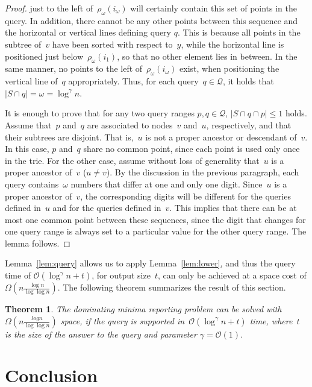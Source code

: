 \documentclass[]{article}
\newcommand{\bigO}{\mathcal{O}}
\newtheorem{theorem}{Theorem}[section]
\begin{document}
\begin{proof}
  just to the left of~$\rho_{\omega}(i_{\omega})$ will certainly contain this
  set of points in the query. In addition, there cannot be any other points
  between this sequence and the horizontal or vertical lines defining query $q$.
  This is because all points in the subtree of~$v$ have been sorted with respect
  to~$y$, while the horizontal line is positioned just
  below~$\rho_{\omega}(i_1)$, so that no other element lies in between. In the
  same manner, no points to the left of~$\rho_{\omega}(i_{\omega})$ exist, when
  positioning the vertical line of~$q$ appropriately. Thus, for each query~$q
  \in \mathcal{Q}$, it holds that~$|S\cap q|=\omega=\log^\gamma{n}$.

  It is enough to prove that for any two query ranges $p,q \in \mathcal{Q}$, $|S
  \cap q \cap p| \leq 1$ holds. Assume that~$p$ and~$q$ are associated to
  nodes~$v$ and~$u$, respectively, and that their subtrees are disjoint. That
  is,~$u$ is not a proper ancestor or descendant of~$v$. In this case, $p$
  and~$q$ share no common point, since each point is used only once in the trie.
  For the other case, assume without loss of generality that~$u$ is a proper
  ancestor of~$v$ ($u \neq v$). By the discussion in the previous paragraph,
  each query contains~$\omega$ numbers that differ at one and only one digit.
  Since~$u$ is a proper ancestor of~$v$, the corresponding digits will be
  different for the queries defined in~$u$ and for the queries defined in~$v$.
  This implies that there can be at most one common point between these
  sequences, since the digit that changes for one query range is always set to a
  particular value for the other query range. The lemma follows.
\end{proof}
Lemma~\ref{lem:query} allows us to apply Lemma~\ref{lem:lower}, and thus the
query time of $\bigO(\log^\gamma{n} + t)$, for output size~$t$, can only be
achieved at a space cost of $\Omega
\left(n\frac{\log{n}}{\log{\log{n}}}\right)$. The following theorem summarizes
the result of this section.
\begin{theorem} \label{thm:lower}
  The dominating minima reporting problem can be solved with
  $\Omega\left(n\frac{log{n}}{\log{\log{n}}}\right)$ space, if the query is
  supported in~$\bigO(\log^\gamma{n} + t)$ time, where~$t$ is the size of the
  answer to the query and parameter $\gamma = \bigO(1)$.
\end{theorem}

\section{Conclusion} \label{sect:concl}
\end{document}
